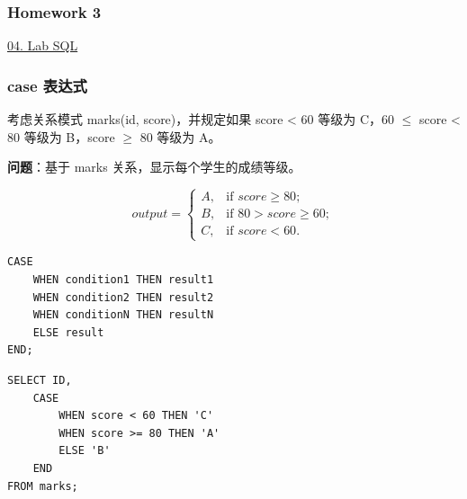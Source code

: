 \documentclass[aspectratio=169, 14pt]{beamer}
\begin{document}
\begin{frame}
    \frametitle{Homework 3}

    \href{https://github.com/ChenZhongPu/db-swufe/tree/master/04_lab_sql}{04. Lab SQL}

\end{frame}

\begin{frame}
    \frametitle{case 表达式}

    考虑关系模式 marks(id, score)，并规定如果 score < 60 等级为 C，60 $\leq$ score < 80 等级为 B，score $\geq$ 80 等级为 A。

    \textbf{问题}：基于 marks 关系，显示每个学生的成绩等级。
    
\[
output = \begin{cases}
    A, & \text{if $score \geq 80$}; \\
    B, & \text{if $80 > score \geq 60$}; \\
    C, & \text{if $score < 60$}.
\end{cases}
\]
\end{frame}
\begin{frame}[fragile]
    \begin{verbatim}
CASE
    WHEN condition1 THEN result1
    WHEN condition2 THEN result2
    WHEN conditionN THEN resultN
    ELSE result
END;
    \end{verbatim}

    \begin{verbatim}
SELECT ID,
    CASE
        WHEN score < 60 THEN 'C'
        WHEN score >= 80 THEN 'A'
        ELSE 'B'
    END
FROM marks;
    \end{verbatim}

\end{frame}
\end{document}
